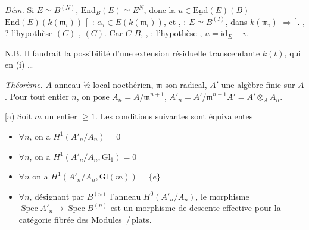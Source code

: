 \documentclass[11pt,a4paper]{article}
\begin{document}
\emph{Dém.} Si $E \simeq B^{(N)}$, \ill{} \ill{}
$\mathrm{End}_B(E) \simeq E^{N}$, donc la  \ill{}
 $u \in \underline{\mathrm{End}}(E)(B)$ \ill{}
\ill{}
$\underline{\mathrm{End}}(E)(k(\mathfrak{m}_i))$ \ill{} \ill{}
[\,\ill{} \ill{} \ill{} : \ill{} \ill{} \ill{}
$\alpha_i \in E(k(\mathfrak{m}_i))$, et \ill{} \ill{} \ill{}, \ill{} :
$E \simeq B^{(I)}$, \ill{} \ill{} \ill{} \ill{} \ill{} dans
$k(\mathfrak{m}_i)$ \ill{} $\Rightarrow$\,]. \ill{} \ill{}, \ill{} ?
\ill{} l'hypothèse \ill{} \ill{} \ill{}$(C)$ \ill{}, \ill{}
\ill{} \ill{} \ill{} \ill{} \ill{}$(C)$. Car \ill{} \ill{} \ill{}
\ill{} \ill{} \ill{} $C$ \ill{} $B$, \ill{} \ill{} \ill{} \ill{}
\struck{\ill{}}, \ill{} : l'hypothèse \ill{}, \ill{} \ill{} \ill{}
\ill{} \ill{} $u = \mathrm{id}_E - v$.

N.B. Il faudrait  la possibilité d'une extension
résiduelle transcendante $k(t)$, qui  \ill{} \ill{}
\ill{} en (i) \ldots


\emph{Théorème.} $A$ anneau  ½ local noethérien,
\struck{\ill{}} $\mathfrak{m}$ son radical, $A'$ une algèbre finie sur $A$.
Pour tout entier $n$, on pose $A_n = A/\mathfrak{m}^{n+1}$,
$A'_n = A'/\mathfrak{m}^{n+1}A' = A' \otimes_A A_n$.

[a) Soit $m$ un entier $\geqslant 1$. Les conditions suivantes sont
équivalentes
\begin{itemize}
  \item[(i)] $\forall n$, on a $H^1(A'_n/A_n) = 0$
  \item[(ii$_1$)] $\forall n$, on a $H^1(A'_n/A_n, \mathrm{Gl}_1) = 0$
  \item[(ii$_m$)] $\forall n$ on a $H^1(A'_n/A_n, \mathrm{Gl}(m)) = \{e\}$
  \item[(iii)] $\forall n$, désignant par $B^{(n)}$ l'anneau
  $H^0(A'_n/A_n)$, le morphisme $\operatorname{Spec} A'_n \to
  \operatorname{Spec} B^{(n)}$ est un morphisme de descente effective pour
  la catégorie fibrée des Modules \,/\,plats.
\end{itemize}
\end{document}
